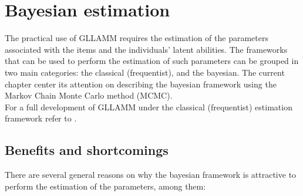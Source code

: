\chapter{Bayesian estimation} \label{chap:estimation}

The practical use of GLLAMM requires the estimation of the parameters associated with the items and the individuals' latent abilities. The frameworks that can be used to perform the estimation of such parameters can be grouped in two main categories: the classical (frequentist), and the bayesian. The current chapter center its attention on describing the bayesian framework using the Markov Chain Monte Carlo method (MCMC). \\

For a full development of GLLAMM under the classical (frequentist) estimation framework refer to \citet{Rabe_et_al_2004a, Rabe_et_al_2004b, Skrondal_et_al_2004a, Rabe_et_al_2012}.


\section{Benefits and shortcomings}

There are several general reasons on why the bayesian framework is attractive to perform the estimation of the parameters, among them:

